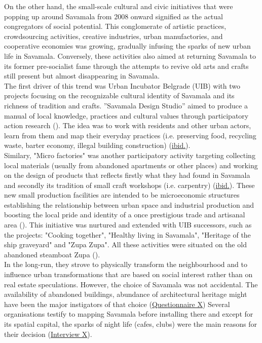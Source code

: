 \documentclass[11pt]{report}
\begin{document}
On the other hand, the small-scale cultural and civic initiatives that were popping up around Savamala from 2008 onward signified as the actual congregators of social potential. This conglomerate of artistic practices, crowdsourcing activities, creative industries, urban manufactories, and cooperative economies was growing, gradually infusing the sparks of new urban life in Savamala. Conversely, these activities also aimed at returning Savamala to its former pre-socialist fame through the attempts to revive old arts and crafts still present but almost disappearing in Savamala.
\\

The first driver of this trend was Urban Incubator Belgrade (UIB) with two projects focusing on the recognizable cultural identity of Savamala and its richness of tradition and crafts. ”Savamala Design Studio” aimed to produce a manual of local knowledge, practices and cultural values through participatory action research (\href{Cvetinovic}{\citealt{cvetinovic_engine_2013}}).
The idea was to work with residents and other urban actors, learn from them and map their everyday practices (i.e. preserving food, recycling waste, barter economy, illegal building construction) (\href{Cvetinovic}{ibid.}).
\\

Similary, "Micro factories" was another participatory activity targeting collecting local materials (usually from abandoned apartments or other places) and working on the design of products that reflects firstly what they had found in Savamala and secondly its tradition of small craft workshops (i.e. carpentry) (\href{Cvetinovic}{ibid.}). 
These new small production facilities are intended to be microeconomic structures establishing the relationship between urban space and industrial production and boosting the local pride and identity of a once prestigious trade and artisanal area (\href{ref}{\citealt{factories_micro_2013}}).
This initiative was nurtured and extended with UIB successors, such as the projects: "Cooking together", "Healthy living in Savamala", "Heritage of the ship graveyard" and "Zupa Zupa".
All these activities were situated on the old abandoned steamboat Zupa (\href{ref}{\citealt{belic_parobrod_2014}}).
\\


In the long-run, they strove to physically transform the neighbourhood and to influence urban transformations that are based on social interest rather than on real estate speculations. However, the choice of Savamala was not accidental. The availability of abandoned buildings, abundance of architectural heritage might have been the major instigators of that choice 
(\href{Questionnaire Experts Savamala}{Questionnaire X})
Several organisations testify to mapping Savamala before installing there and except for its spatial capital, the sparks of night life (cafes, clubs) were the main reasons for their decision 
(\href{InterviewX}{Interview X}).
\\
\end{document}
